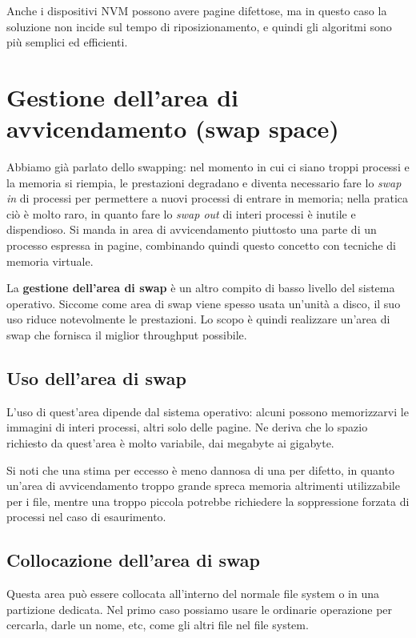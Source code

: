         Anche i dispositivi NVM possono avere pagine difettose, ma in questo caso la soluzione non incide sul tempo di riposizionamento, e quindi gli algoritmi sono più semplici ed efficienti.
        
\section{Gestione dell'area di avvicendamento (swap space)}
    Abbiamo già parlato dello swapping: nel momento in cui ci siano troppi processi e la memoria si riempia, le prestazioni degradano e diventa necessario fare lo \textit{swap in} di processi per permettere a nuovi processi di entrare in memoria; nella pratica ciò è molto raro, in quanto fare lo \textit{swap out} di interi processi è inutile e dispendioso. Si manda in area di avvicendamento piuttosto una parte di un processo espressa in pagine, combinando quindi questo concetto con tecniche di memoria virtuale.
    
    La \textbf{gestione dell'area di swap} è un altro compito di basso livello del sistema operativo. Siccome come area di swap viene spesso usata un'unità a disco, il suo uso riduce notevolmente le prestazioni. Lo scopo è quindi realizzare un'area di swap che fornisca il miglior throughput possibile.
    
    \subsection{Uso dell'area di swap}
        L'uso di quest'area dipende dal sistema operativo: alcuni possono memorizzarvi le immagini di interi processi, altri solo delle pagine. Ne deriva che lo spazio richiesto da quest'area è molto variabile, dai megabyte ai gigabyte.
        
        Si noti che una stima per eccesso è meno dannosa di una per difetto, in quanto un'area di avvicendamento troppo grande spreca memoria altrimenti utilizzabile per i file, mentre una troppo piccola potrebbe richiedere la soppressione forzata di processi nel caso di esaurimento.
        
    \subsection{Collocazione dell'area di swap}
        Questa area può essere collocata all'interno del normale file system o in una partizione dedicata. Nel primo caso possiamo usare le ordinarie operazione per cercarla, darle un nome, etc, come gli altri file nel file system.
        
